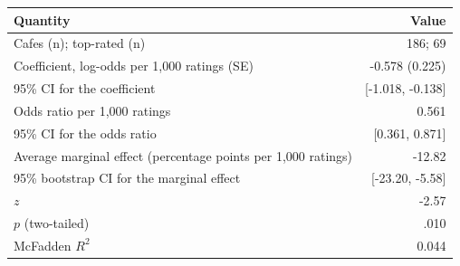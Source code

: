 \begin{tabular}{lr}
\toprule
Quantity & Value \\
\midrule
Cafes (n); top-rated (n) & 186; 69 \\
Coefficient, log-odds per 1,000 ratings (SE) & -0.578 (0.225) \\
95\% CI for the coefficient & [-1.018, -0.138] \\
Odds ratio per 1,000 ratings & 0.561 \\
95\% CI for the odds ratio & [0.361, 0.871] \\
Average marginal effect (percentage points per 1,000 ratings) & -12.82 \\
95\% bootstrap CI for the marginal effect & [-23.20, -5.58] \\
$z$ & -2.57 \\
$p$ (two-tailed) & .010 \\
McFadden $R^2$ & 0.044 \\
\bottomrule
\end{tabular}
